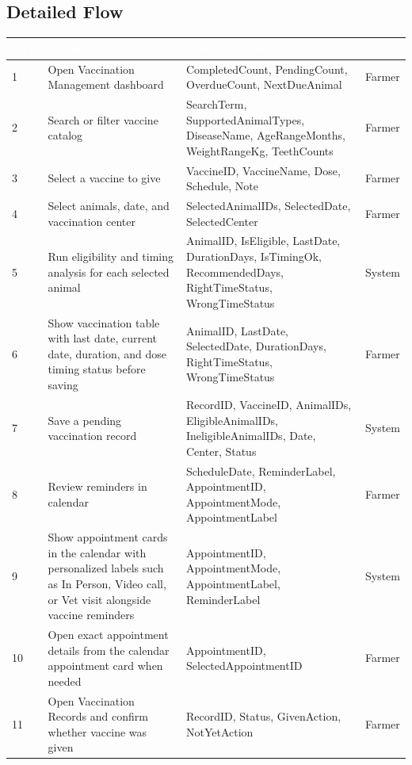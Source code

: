 \documentclass[12pt]{article}
\begin{document}
\subsection{Detailed Flow}

\begin{longtable}{|p{1.2cm}|p{5.6cm}|p{5.7cm}|p{2cm}|}
\hline
\rowcolor{headerblue}\textcolor{white}{\textbf{Step}} & \textcolor{white}{\textbf{Action}} & \textcolor{white}{\textbf{Metadata Used}} & \textcolor{white}{\textbf{Actor}} \\
\hline
1 & Open Vaccination Management dashboard & CompletedCount, PendingCount, OverdueCount, NextDueAnimal & Farmer \\
\hline
\rowcolor{rowgray}
2 & Search or filter vaccine catalog & SearchTerm, SupportedAnimalTypes, DiseaseName, AgeRangeMonths, WeightRangeKg, TeethCounts & Farmer \\
\hline
3 & Select a vaccine to give & VaccineID, VaccineName, Dose, Schedule, Note & Farmer \\
\hline
\rowcolor{rowgray}
4 & Select animals, date, and vaccination center & SelectedAnimalIDs, SelectedDate, SelectedCenter & Farmer \\
\hline
5 & Run eligibility and timing analysis for each selected animal & AnimalID, IsEligible, LastDate, DurationDays, IsTimingOk, RecommendedDays, RightTimeStatus, WrongTimeStatus & System \\
\hline
\rowcolor{rowgray}
6 & Show vaccination table with last date, current date, duration, and dose timing status before saving & AnimalID, LastDate, SelectedDate, DurationDays, RightTimeStatus, WrongTimeStatus & Farmer \\
\hline
7 & Save a pending vaccination record & RecordID, VaccineID, AnimalIDs, EligibleAnimalIDs, IneligibleAnimalIDs, Date, Center, Status & System \\
\hline
\rowcolor{rowgray}
8 & Review reminders in calendar & ScheduleDate, ReminderLabel, AppointmentID, AppointmentMode, AppointmentLabel & Farmer \\
\hline
9 & Show appointment cards in the calendar with personalized labels such as In Person, Video call, or Vet visit alongside vaccine reminders & AppointmentID, AppointmentMode, AppointmentLabel, ReminderLabel & System \\
\hline
\rowcolor{rowgray}
10 & Open exact appointment details from the calendar appointment card when needed & AppointmentID, SelectedAppointmentID & Farmer \\
\hline
11 & Open Vaccination Records and confirm whether vaccine was given & RecordID, Status, GivenAction, NotYetAction & Farmer \\

\end{longtable}
\end{document}
